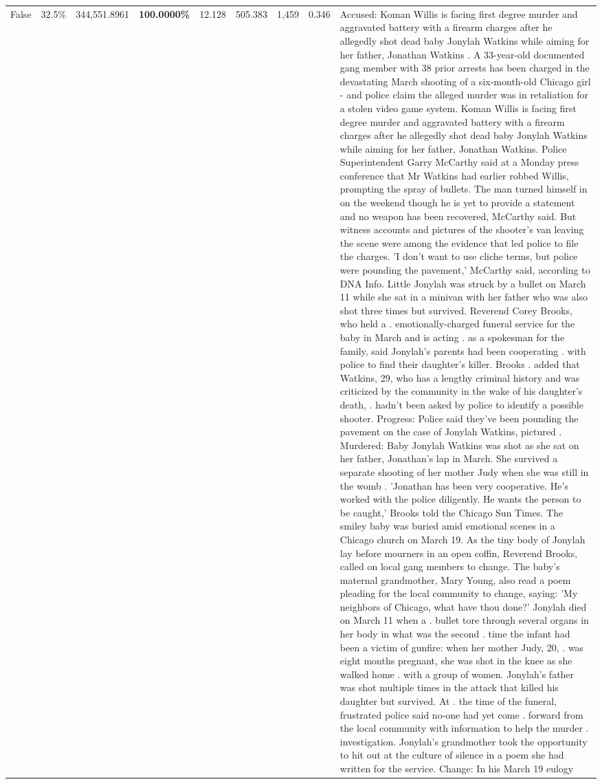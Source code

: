 \begin{table}[H]
\begin{tabular}{lllrlllll}
False & 32.5\% & 344,551.8961 & \bfseries \color{red} 100.0000\% & 12.128 & 505.383 & 1,459 & 0.346 & Accused: Koman Willis is facing first degree murder and aggravated battery with a firearm charges after he allegedly shot dead baby Jonylah Watkins while aiming for her father, Jonathan Watkins . A 33-year-old documented gang member with 38 prior arrests has been charged in the devastating March shooting of a six-month-old Chicago girl - and police claim the alleged murder was in retaliation for a stolen video game system. Koman Willis is facing first degree murder and aggravated battery with a firearm charges after he allegedly shot dead baby Jonylah Watkins while aiming for her father, Jonathan Watkins. Police Superintendent Garry McCarthy said at a Monday press conference that Mr Watkins had earlier robbed Willis, prompting the spray of bullets. The man turned himself in on the weekend though he is yet to provide a statement and no weapon has been recovered, McCarthy said. But witness accounts and pictures of the shooter's van leaving the scene were among the evidence that led police to file the charges. 'I don't want to use cliche terms, but police were pounding the pavement,' McCarthy said, according to DNA Info. Little Jonylah was struck by a bullet on March 11 while she sat in a minivan with her father who was also shot three times but survived. Reverend Corey Brooks, who held a . emotionally-charged funeral service for the baby in March and is acting . as a spokesman for the family, said Jonylah's parents had been cooperating . with police to find their daughter's killer. Brooks . added that Watkins, 29, who has a lengthy criminal history and was criticized by the community in the wake of his daughter's death, . hadn't been asked by police to identify a possible shooter. Progress: Police said they've been pounding the pavement on the case of Jonylah Watkins, pictured . Murdered: Baby Jonylah Watkins was shot as she sat on her father, Jonathan's lap in March. She survived a separate shooting of her mother Judy when she was still in the womb . 'Jonathan has been very cooperative. He's worked with the police diligently. He wants the person to be caught,' Brooks told the Chicago Sun Times. The smiley baby was buried amid emotional scenes in a Chicago church on March 19. As the tiny body of Jonylah lay before mourners in an open coffin, Reverend Brooks, called on local gang members to change. The baby's maternal grandmother, Mary Young, also read a poem pleading for the local community to change, saying: 'My neighbors of Chicago, what have thou done?' Jonylah died on March 11 when a . bullet tore through several organs in her body in what was the second . time the infant had been a victim of gunfire: when her mother Judy, 20, . was eight months pregnant, she was shot in the knee as she walked home . with a group of women. Jonylah's father was shot multiple times in the attack that killed his daughter but survived. At . the time of the funeral, frustrated police said no-one had yet come . forward from the local community with information to help the murder . investigation. Jonylah's grandmother took the opportunity to hit out at the culture of silence in a poem she had written for the service. Change: In his March 19 eulogy 
\end{tabular}
\end{table}

